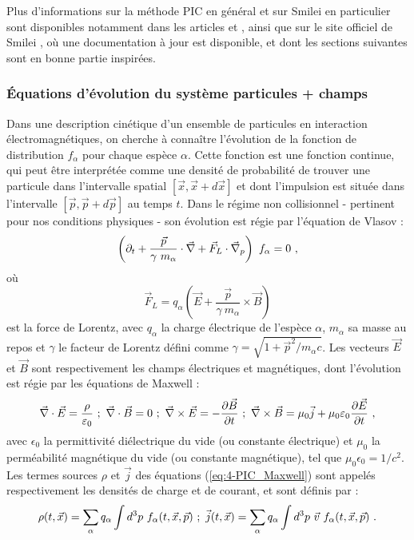 \begin{refsection}
Plus d'informations sur la méthode PIC en général et sur Smilei en particulier sont disponibles notamment dans les articles \parencite{tskhakaya_2007} et \parencite{derouillat_2018}, ainsi que sur le site officiel de Smilei \parencite{smilei_web}, où une documentation à jour est disponible, et dont les sections suivantes sont en bonne partie inspirées. 

\subsubsection{Équations d'évolution du système particules + champs}

Dans une description cinétique d'un ensemble de particules en interaction électromagnétiques, on cherche à connaître l'évolution de la fonction de distribution $f_\alpha$ pour chaque espèce $\alpha$. Cette fonction est une fonction continue, qui peut être interprétée comme une densité de probabilité de trouver une particule dans l’intervalle spatial $[\vec{x},\vec{x}+d\vec{x}]$ et dont l'impulsion est située dans l'intervalle $[\vec{p},\vec{p}+d\vec{p}]$ au temps $t$. Dans le régime non collisionnel - pertinent pour nos conditions physiques - son évolution est régie par l'équation de Vlasov :
\begin{equation}
    \left(\partial_t + \dfrac{\vec{p}}{\gamma ~ m_\alpha} \cdot \vec{\nabla} + \vec{F}_L \cdot \vec{\nabla}_p \right) ~ f_\alpha= 0 ~ \rm ,
    \label{eq:4-PIC_Vlasov}
\end{equation}
où 
\begin{equation}
    \vec{F}_L = q_\alpha \left(\vec{E} + \dfrac{\vec{p}}{\gamma ~ m_\alpha} \times \vec{B}\right)
\end{equation}
est la force de Lorentz, avec $q_\alpha$ la charge électrique de l'espèce $\alpha$, $m_\alpha$ sa masse au repos et $\gamma$ le facteur de Lorentz défini comme $\gamma=\sqrt{1+\vec{p}^2/m_\alpha c}$. Les vecteurs $\vec{E}$ et $\vec{B}$ sont respectivement les champs électriques et magnétiques, dont l'évolution est régie par les équations de Maxwell :
\begin{equation}
    \vec{\nabla} \cdot \vec{E} = \dfrac{\rho}{\varepsilon_0} ~ ; ~
    \vec{\nabla} \cdot \vec{B} = 0 ~ ; ~
    \vec{\nabla} \times \vec{E} = - \dfrac{\partial \vec{B}}{\partial t} ~ ; ~
    \vec{\nabla} \times \vec{B} = \mu_0 \vec{j} + \mu_0 \varepsilon_0 \dfrac{\partial \vec{E}}{\partial t} ~ \rm ,
    \label{eq:4-PIC_Maxwell}
\end{equation}
avec $\epsilon_0$ la permittivité diélectrique du vide (ou constante électrique) et $\mu_0$ la perméabilité magnétique du vide (ou constante magnétique), tel que $\mu_0 \epsilon_0 = 1/c^2$.
Les termes sources $\rho$ et $\vec{j}$ des équations (\ref{eq:4-PIC_Maxwell}) sont appelés respectivement les densités de charge et de courant, et sont définis par :
\begin{equation}
    \rho(t, \vec{x}) = \sum_\alpha q_\alpha \int d^3p ~ f_\alpha(t, \vec{x}, \vec{p}) ~ ; ~
    \vec{j}(t, \vec{x}) = \sum_\alpha q_\alpha \int d^3p ~ \vec{v} ~ f_\alpha(t, \vec{x}, \vec{p}) ~ \rm .
    \label{eq:4-PIC_densite-charge_courant}
\end{equation}


\end{refsection}

